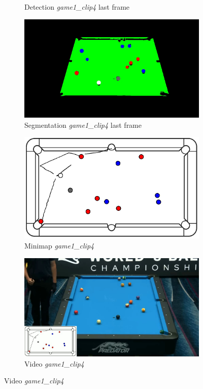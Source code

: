 \begin{figure}[H]
\begin{subfigure}[b]{0.48\textwidth}
		\caption{Detection \textit{game1\_clip4} last frame}
		\label{fig: game1_clip4_last_frame_detected}
	\end{subfigure}
	\begin{subfigure}[b]{0.48\textwidth}
		\centering
		\includegraphics[width=\textwidth]{images/Segmentation/game1_clip4_segmented_balls_last_frame.jpg}
		\caption{Segmentation \textit{game1\_clip4} last frame}
		\label{fig: game1_clip4_last_frame_segmented}
	\end{subfigure}
	\begin{subfigure}[b]{0.48\textwidth}
		\centering
		\includegraphics[width=\textwidth]{images/AllMinimap/game1_clip4_minimap.png}
		\caption{Minimap \textit{game1\_clip4}}
		\label{fig: game1_clip4_minimap}
	\end{subfigure}
	\begin{subfigure}[b]{0.48\textwidth}
		\centering
		\includegraphics[width=\textwidth]{images/Video/game1_clip4_video.jpg}
		\caption{Video \textit{game1\_clip4}}
		\label{fig: game1_clip4_video}
	\end{subfigure}


\end{figure}
